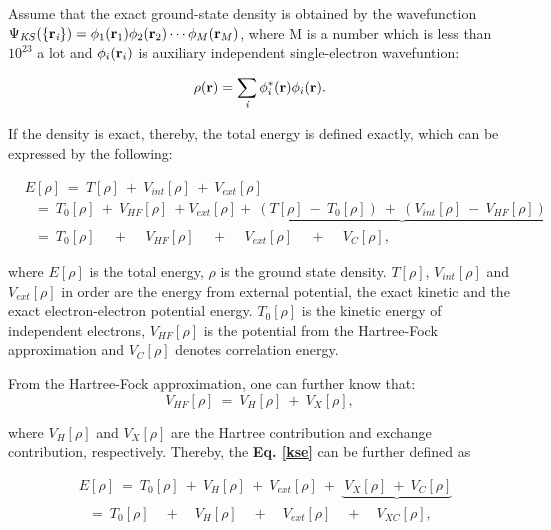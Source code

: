 \documentclass[a4paper, 12pt, titlepage,oneside,drop]{kthesis}
\begin{document}
Assume that the exact ground-state density is obtained by the wavefunction $\wfks = \bwf<1><1> \bwf<2><2> \cdots \bwf<M><M>$, where M is a number which is 
less than $10^{23}$ a lot and $\bwf<i><i>$ is auxiliary independent single-electron wavefuntion:

\begin{equation}\label{ks1}
 \rho(\textbf{r}) = \sumi<i> {\phi^{*}_{i}(\textbf{r})} {\phi_{i}(\textbf{r})}.
\end{equation}

If the density is exact, thereby, the total energy is defined exactly, which can be expressed by the following:

\begin{equation}\label{kse}
\begin{split}
&E[\rho] \ =\ T[\rho] \ + \ V_\textit{int}[\rho] \ + \ V_\textit{ext}[\rho]  \\
&\ \ \   = \ T_{0}[\rho] \ + \ V_\textit{HF}[\rho] \ + V_\textit{ext}[\rho]+\underbrace{\ (T[\rho] \ - \ T_{0}[\rho]) \ + \  (V_\textit{int}[\rho] \ - \ V_\textit{HF}[\rho])\ }       \\
&\ \ \   = \ T_{0}[\rho] \quad \,  + \quad \,  V_\textit{HF}[\rho] \quad \, + \quad \, V_\textit{ext}[\rho] \quad \, + \quad \, V_\textit{C}[\rho],
\end{split}
\end{equation}

where $E[\rho]$  is the total energy, $\rho$ is the ground state density. $T[\rho]$, $V_\textit{int}[\rho]$ and $V_\textit{ext}[\rho]$ in order are the energy from external potential, the exact kinetic 
and the exact electron-electron potential energy. $T_{0}[\rho]$ is the kinetic energy of independent electrons, $V_\textit{HF}[\rho]$ is the potential from the Hartree-Fock approximation and $V_\textit{C}[\rho]$
denotes correlation energy.

From the Hartree-Fock approximation, one can further know that:
\begin{equation}
 V_\textit{HF}[\rho] \ = \ V_\textit{H}[\rho] \ + \ V_\textit{X}[\rho], 
\end{equation}

where $V_\textit{H}[\rho]$ and $ V_\textit{X}[\rho] $ are the Hartree contribution and exchange contribution, respectively. Thereby, the \textbf{Eq. \ref{kse}} can be further defined as

\begin{equation}\label{ccc}
\begin{split}
&E[\rho]\ = \ T_{0}[\rho] \ + \ V_\textit{H}[\rho] \ + \ V_\textit{ext}[\rho] \ + \ \underbrace{\ V_\textit{X}[\rho]  \ + \ V_\textit{C}[\rho]}  \\
&\ \ \ = \ T_{0}[\rho] \quad + \quad V_\textit{H}[\rho] \quad + \quad V_\textit{ext}[\rho] \quad + \quad V_\textit{XC}[\rho],
\end{split}\end{equation}
\end{document}
